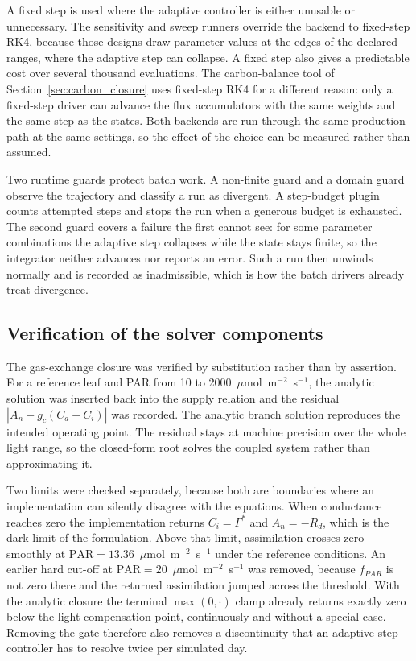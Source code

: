 A fixed step is used where the adaptive controller is either unusable or
unnecessary. The sensitivity and sweep runners override the backend to
fixed-step RK4, because those designs draw parameter values at the edges of the
declared ranges, where the adaptive step can collapse. A fixed step also gives a
predictable cost over several thousand evaluations. The carbon-balance
tool of Section~\ref{sec:carbon_closure} uses fixed-step RK4 for a different
reason: only a fixed-step driver can advance the flux accumulators with the same
weights and the same step as the states. Both backends are run through the same
production path at the same settings, so the effect of the choice can be
measured rather than assumed.

Two runtime guards protect batch work. A non-finite guard and a domain guard
observe the trajectory and classify a run as divergent. A step-budget plugin
counts attempted steps and stops the run when a generous budget is exhausted.
The second guard covers a failure the first cannot see: for some parameter
combinations the adaptive step collapses while the state stays finite, so the
integrator neither advances nor reports an error. Such a run then unwinds
normally and is recorded as inadmissible, which is how the batch drivers already
treat divergence.

\subsection{Verification of the solver components}
\label{sec:verification}

The gas-exchange closure was verified by substitution rather than by assertion.
For a reference leaf and PAR from 10 to
2000~$\mu$mol~m$^{-2}$~s$^{-1}$, the analytic solution was inserted back into
the supply relation and the residual $|A_n - g_c(C_a - C_i)|$ was recorded. The
analytic branch solution reproduces the intended operating point. The residual
stays at machine precision over the whole light range, so the closed-form root
solves the coupled system rather than approximating it.

Two limits were checked separately, because both are boundaries where an
implementation can silently disagree with the equations. When conductance
reaches zero the implementation returns $C_i = \Gamma^\ast$ and
$A_n = -R_d$, which is the dark limit of the formulation. Above that limit,
assimilation crosses zero smoothly at $\mathrm{PAR}=13.36$~$\mu$mol~m$^{-2}$~s$^{-1}$
under the reference conditions. An earlier hard cut-off at
$\mathrm{PAR}=20$~$\mu$mol~m$^{-2}$~s$^{-1}$ was removed, because $f_{PAR}$ is
not zero there and the returned assimilation jumped across the threshold. With
the analytic closure the terminal $\max(0,\cdot)$ clamp already returns exactly
zero below the light compensation point, continuously and without a special
case. Removing the gate therefore also removes a discontinuity that an adaptive
step controller has to resolve twice per simulated day.

